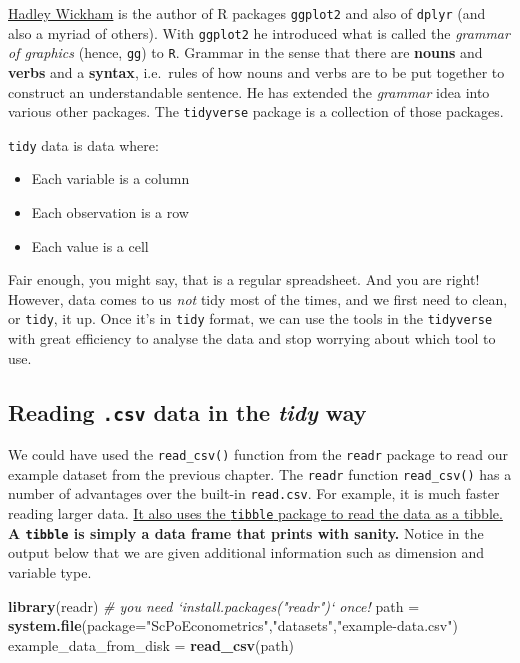 \documentclass[]{book}
\newenvironment{Shaded}{\begin{snugshade}}{\end{snugshade}}
\newcommand{\KeywordTok}[1]{\textcolor[rgb]{0.13,0.29,0.53}{\textbf{#1}}}
\newcommand{\DataTypeTok}[1]{\textcolor[rgb]{0.13,0.29,0.53}{#1}}
\newcommand{\StringTok}[1]{\textcolor[rgb]{0.31,0.60,0.02}{#1}}
\newcommand{\CommentTok}[1]{\textcolor[rgb]{0.56,0.35,0.01}{\textit{#1}}}
\newcommand{\NormalTok}[1]{#1}
\providecommand{\tightlist}{%
  \setlength{\itemsep}{0pt}\setlength{\parskip}{0pt}}
\begin{document}
\href{http://hadley.nz}{Hadley Wickham} is the author of R packages
\texttt{ggplot2} and also of \texttt{dplyr} (and also a myriad of
others). With \texttt{ggplot2} he introduced what is called the
\emph{grammar of graphics} (hence, \texttt{gg}) to \texttt{R}. Grammar
in the sense that there are \textbf{nouns} and \textbf{verbs} and a
\textbf{syntax}, i.e.~rules of how nouns and verbs are to be put
together to construct an understandable sentence. He has extended the
\emph{grammar} idea into various other packages. The \texttt{tidyverse}
package is a collection of those packages.

\texttt{tidy} data is data where:

\begin{itemize}
\tightlist
\item
  Each variable is a column
\item
  Each observation is a row
\item
  Each value is a cell
\end{itemize}

Fair enough, you might say, that is a regular spreadsheet. And you are
right! However, data comes to us \emph{not} tidy most of the times, and
we first need to clean, or \texttt{tidy}, it up. Once it's in
\texttt{tidy} format, we can use the tools in the \texttt{tidyverse}
with great efficiency to analyse the data and stop worrying about which
tool to use.

\subsection{\texorpdfstring{Reading \texttt{.csv} data in the
\emph{tidy}
way}{Reading .csv data in the tidy way}}\label{reading-.csv-data-in-the-tidy-way}

We could have used the \texttt{read\_csv()} function from the
\texttt{readr} package to read our example dataset from the previous
chapter. The \texttt{readr} function \texttt{read\_csv()} has a number
of advantages over the built-in \texttt{read.csv}. For example, it is
much faster reading larger data.
\href{https://cran.r-project.org/web/packages/tibble/vignettes/tibble.html}{It
also uses the \texttt{tibble} package to read the data as a tibble.}
\textbf{A \texttt{tibble} is simply a data frame that prints with
sanity.} Notice in the output below that we are given additional
information such as dimension and variable type.

\begin{Shaded}
\begin{Highlighting}[]
\KeywordTok{library}\NormalTok{(readr)  }\CommentTok{# you need `install.packages("readr")` once!}
\NormalTok{path =}\StringTok{ }\KeywordTok{system.file}\NormalTok{(}\DataTypeTok{package=}\StringTok{"ScPoEconometrics"}\NormalTok{,}\StringTok{"datasets"}\NormalTok{,}\StringTok{"example-data.csv"}\NormalTok{)}
\NormalTok{example_data_from_disk =}\StringTok{ }\KeywordTok{read_csv}\NormalTok{(path)}
\end{Highlighting}
\end{Shaded}
\end{document}
